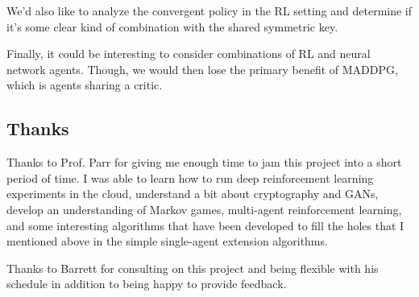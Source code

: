 \documentclass{llncs}
\begin{document}
We'd also like to analyze the convergent policy in the RL setting and determine if it's some clear kind of combination with the shared symmetric key. 

Finally, it could be interesting to consider combinations of RL and neural network agents. Though, we would then lose the primary benefit of MADDPG, which is agents sharing a critic.
\subsection{Thanks}

Thanks to Prof. Parr for giving me enough time to jam this project into a short period of time. I was able to learn how to run deep reinforcement learning experiments in the cloud, understand a bit about cryptography and GANs, develop an understanding of Markov games, multi-agent reinforcement learning, and some interesting algorithms that have been developed to fill the holes that I mentioned above in the simple single-agent extension algorithms. 

Thanks to Barrett for consulting on this project and being flexible with his schedule in addition to being happy to provide feedback. 



\nocite{*}

%
%
%
\end{document}
